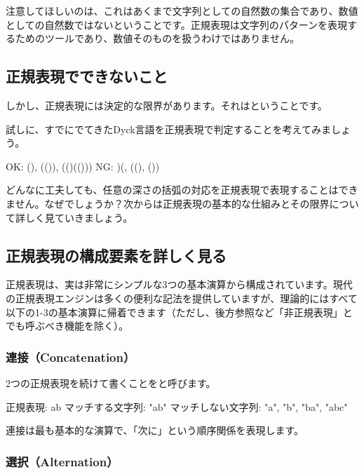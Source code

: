 注意してほしいのは、これはあくまで文字列としての自然数の集合であり、数値としての自然数ではないということです。正規表現は文字列のパターンを表現するためのツールであり、数値そのものを扱うわけではありません。

\subsection{正規表現でできないこと}

しかし、正規表現には決定的な限界があります。それはということです。

試しに、すでにでてきたDyck言語を正規表現で判定することを考えてみましょう。

\begin{codescreen}{}
OK:  (), (()), (()(()))
NG:  )(, ((), ())
\end{codescreen}

どんなに工夫しても、任意の深さの括弧の対応を正規表現で表現することはできません。なぜでしょうか？次からは正規表現の基本的な仕組みとその限界について詳しく見ていきましょう。

\subsection{正規表現の構成要素を詳しく見る}

正規表現は、実は非常にシンプルな3つの基本演算から構成されています。現代の正規表現エンジンは多くの便利な記法を提供していますが、理論的にはすべて以下の1-3の基本演算に帰着できます（ただし、後方参照など「非正規表現」とでも呼ぶべき機能を除く）。

\subsubsection{連接（Concatenation）}

2つの正規表現を続けて書くことをと呼びます。

\begin{codescreen}{}
正規表現: ab
マッチする文字列: "ab"
マッチしない文字列: "a", "b", "ba", "abc"
\end{codescreen}

連接は最も基本的な演算で、「次に」という順序関係を表現します。

\subsubsection{選択（Alternation）}

